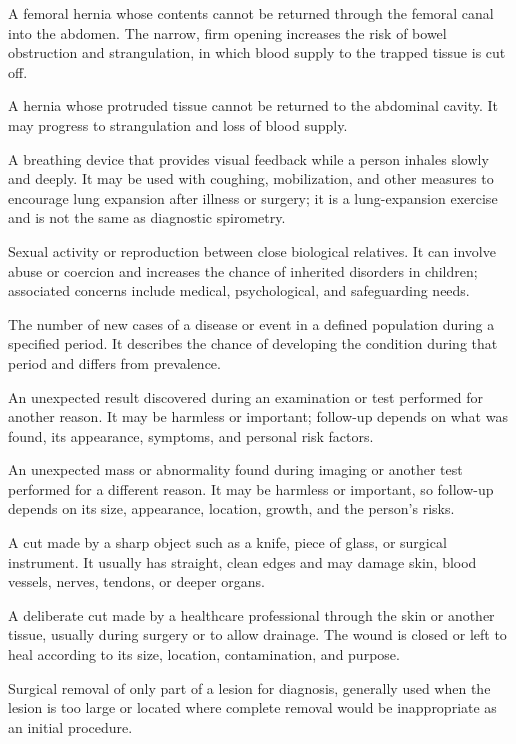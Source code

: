  A femoral hernia whose contents cannot be returned through the femoral canal into the abdomen. The narrow, firm opening increases the risk of bowel obstruction and strangulation, in which blood supply to the trapped tissue is cut off.

 A hernia whose protruded tissue cannot be returned to the abdominal cavity. It may progress to strangulation and loss of blood supply.

 A breathing device that provides visual feedback while a person inhales slowly and deeply. It may be used with coughing, mobilization, and other measures to encourage lung expansion after illness or surgery; it is a lung-expansion exercise and is not the same as diagnostic spirometry.

 Sexual activity or reproduction between close biological relatives. It can involve abuse or coercion and increases the chance of inherited disorders in children; associated concerns include medical, psychological, and safeguarding needs.

 The number of new cases of a disease or event in a defined population during a specified period. It describes the chance of developing the condition during that period and differs from prevalence.

 An unexpected result discovered during an examination or test performed for another reason. It may be harmless or important; follow-up depends on what was found, its appearance, symptoms, and personal risk factors.

 An unexpected mass or abnormality found during imaging or another test performed for a different reason. It may be harmless or important, so follow-up depends on its size, appearance, location, growth, and the person's risks.

 A cut made by a sharp object such as a knife, piece of glass, or surgical instrument. It usually has straight, clean edges and may damage skin, blood vessels, nerves, tendons, or deeper organs.

 A deliberate cut made by a healthcare professional through the skin or another tissue, usually during surgery or to allow drainage. The wound is closed or left to heal according to its size, location, contamination, and purpose.

 Surgical removal of only part of a lesion for diagnosis, generally used when the lesion is too large or located where complete removal would be inappropriate as an initial procedure.

